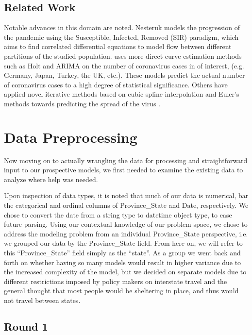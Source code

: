 \documentclass[sigconf,nonacm]{acmart}
\begin{document}
\subsection{Related Work}
Notable advances in this domain are noted. Nesteruk \cite{Nesteruk} models the
progression of the pandemic using the Susceptible, Infected, Removed (SIR)
paradigm, which aims to find correlated differential equations to model flow
between different partitions of the studied population. 
\cite{EJMO} uses more direct curve estimation methods such as Holt and ARIMA on
the number of coronavirus cases in of interest, (e.g. Germany, Japan, Turkey,
the UK, etc.). These models predict the actual number of coronavirus cases to a
high degree of statistical significance. 
Others have applied novel iterative methods based on cubic spline interpolation
and Euler's methods towards predicting the spread of the virus \cite{APPADU2020}.


\section{Data Preprocessing}

Now moving on to actually wrangling the data for processing and straightforward
input to our prospective models, we first needed to examine the existing data
to analyze where help was needed. 

Upon inspection of data types, it is noted
that much of our data is numerical, bar the categorical and ordinal columns of
Province\_State and Date, respectively. We chose to convert the date from a
string type to datetime object type, to ease future parsing. Using our
contextual knowledge of our problem space, we chose to address the modeling
problem from an individual Province\_State perspective, i.e. we grouped our
data by the Province\_State field. From here on, we will refer to this
“Province\_State” field simply as the “state”. As a group we went back and
forth on whether having so many models would result in higher variance due to
the increased complexity of the model, but we decided on separate models due to
different restrictions imposed by policy makers on interstate travel and the
general thought that most people would be sheltering in place, and thus would
not travel between states.

\subsection{Round 1}
\end{document}
